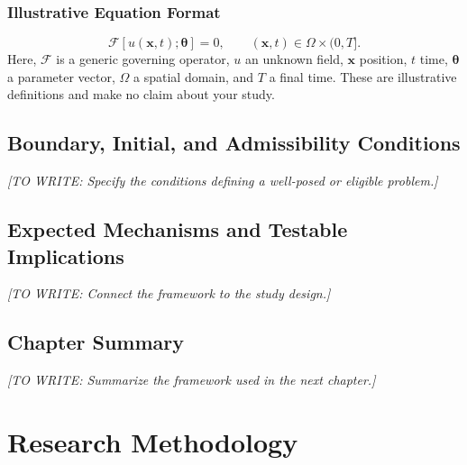 \documentclass[12pt,a4paper,oneside]{report}
\newif\ifshowguidance
\newcommand{\Guide}[1]{%
  \ifshowguidance
  \begin{tcolorbox}[enhanced,breakable,colback=GuideBlue,
    colframe=GuideBorder,boxrule=0.5pt,arc=1mm,
    title={Writing guide --- replace with your research},
    colbacktitle=ThesisBlue,coltitle=white,fonttitle=\small\bfseries,
    before skip=10pt,after skip=10pt]
    \small #1
  \end{tcolorbox}
  \fi}
\newcommand{\Draft}[1]{\par\noindent\textit{[TO WRITE: #1]}\par}
\begin{document}
\subsection{Illustrative Equation Format}
\Guide{The following equation demonstrates formatting only. Replace it with
an equation relevant to your thesis, or delete this subsection. Define the
domain, operators, unknowns, and assumptions for any retained equation.}
\begin{equation}
  \mathcal{F}[u(\mathbf{x},t);\boldsymbol{\theta}]=0,
  \qquad (\mathbf{x},t)\in\Omega\times(0,T].
  \label{eq:governing}
\end{equation}
\noindent Here, $\mathcal{F}$ is a generic governing operator, $u$ an unknown
field, $\mathbf{x}$ position, $t$ time, $\boldsymbol{\theta}$ a parameter vector,
$\Omega$ a spatial domain, and $T$ a final time. These are illustrative
definitions and make no claim about your study.

\section{Boundary, Initial, and Admissibility Conditions}
\Guide{For mathematical/physical models, specify initial and boundary
conditions and their physical justification. For other designs, replace
this section with eligibility conditions or domain constraints. Remove it
when it does not apply.}
\Draft{Specify the conditions defining a well-posed or eligible problem.}

\section{Expected Mechanisms and Testable Implications}
\Guide{Explain how the framework motivates the questions, measurable
quantities, predictions, or interpretation. Avoid presenting expectations
as observations.}
\Draft{Connect the framework to the study design.}

\section{Chapter Summary}
\Draft{Summarize the framework used in the next chapter.}

\chapter{Research Methodology}
\label{ch:methods}
\Guide{Describe what you actually did and why it answers the research
questions. Provide enough detail for a knowledgeable reader to evaluate or
repeat the work. Distinguish preplanned procedures from exploratory changes.
Retain and rename the subsections appropriate to your study.}
\end{document}
